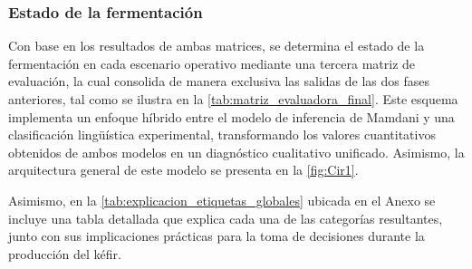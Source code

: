 \newpage

\subsubsection{Estado de la fermentación}

Con base en los resultados de ambas matrices, se determina 
el estado de la fermentación en cada escenario operativo 
mediante una tercera matriz de evaluación, la cual consolida de 
manera exclusiva las salidas de las dos fases anteriores, 
tal como se ilustra en la \cref{tab:matriz_evaluadora_final}. 
Este esquema implementa un enfoque híbrido entre el modelo de inferencia de
Mamdani y una clasificación lingüística experimental, 
transformando los valores cuantitativos obtenidos de ambos modelos 
en un diagnóstico cualitativo unificado. Asimismo, la arquitectura general 
de este modelo se presenta en la \cref{fig:Cir1}.

Asimismo, en la \cref{tab:explicacion_etiquetas_globales} ubicada en el Anexo se incluye una tabla detallada
que explica cada una de las categorías resultantes, 
junto con sus implicaciones prácticas para la toma de decisiones durante la producción del kéfir.

